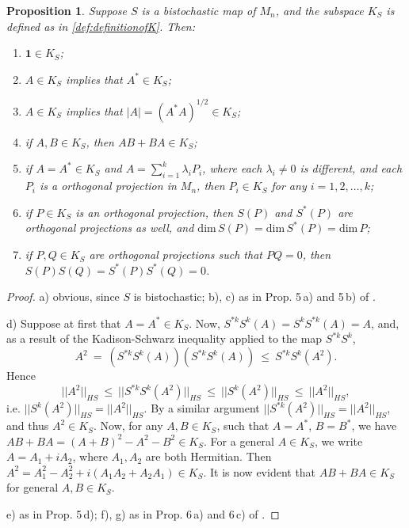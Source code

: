 \documentclass[12pt]{article}
\theoremstyle{plain}
\newtheorem{proposition}{Proposition}
\theoremstyle{definition}
\theoremstyle{remark}
\numberwithin{equation}{section}
\begin{document}
\begin{proposition}
\label{prop:propertiesofK}
Suppose $S$ is a bistochastic map of $M_{n}$,
and the subspace $K_{S}$ is defined as in \eqref{def:definitionofK}.
Then:

\let \oldlabelenumi \labelenumi
\renewcommand{\labelenumi}{\alph{enumi})}
\begin{enumerate}
\item $\mathbf{1} \in K_{S}$;
\item $A \in K_{S}$ implies that $A^{*} \in K_{S}$;
\item  $A  \in K_{S}$ implies that
$|A| = (A^{*}A)^{1/2} \in K_{S}$;
\item if $A, B \in K_{S}$, then $AB + BA \in K_{S}$;
\item if $A = A^{*} \in K_{S}$ and $A = \sum_{i=1}^{k} \lambda_{i} P_{i}$,
where each $\lambda_{i} \neq 0$ is different,
and each $P_{i}$ is a orthogonal projection in $M_{n}$,
then $P_{i} \in K_{S}$ for any $i = 1,2,\ldots,k$;
\item if $P \in K_{S}$ is an orthogonal projection,
then $S(P)$ and $S^{*}(P)$ are orthogonal projections as well,
and $\mathrm{dim} \, S(P) = \mathrm{dim} \, S^{*}(P) = \mathrm{dim} \, P$;
\item if $P, Q \in K_{S}$ are orthogonal projections such that $P Q = 0$,
then $S(P) S(Q) = S^{*}(P) S^{*}(Q) = 0$.
\end{enumerate}
\let \labelenumi \oldlabelenumi
\end{proposition}

\begin{proof}
a) obvious, since $S$ is bistochastic;
b), c) as in Prop. 5\,a) and 5\,b) of \cite{olkiewicz1999environment}.

d)  Suppose at first that $A = A^{*} \in K_{S}$.
Now, $S^{*k} S^{k}(A) = S^{k} S^{*k}(A) = A$,
and, as a result of the Kadison-Schwarz inequality applied to the map
$S^{*k} S^{k}$,
\begin{equation}
A^{2} \: = \: \left( S^{*k} S^{k}(A) \right) \left( S^{*k} S^{k}(A) \right)
    \: \leq \: S^{*k} S^{k}(A^{2}).
\end{equation}
Hence
\begin{equation}
||A^{2}||_{HS} \: \leq \: || S^{*k} S^{k}(A^{2}) ||_{HS} \: \leq \:
    || S^{k}(A^{2}) ||_{HS} \: \leq \: ||A^{2}||_{HS},
\end{equation}
i.e. $|| S^{k}(A^{2}) ||_{HS} = ||A^{2}||_{HS}$.
By a similar argument
$|| S^{*k}(A^{2}) ||_{HS} = ||A^{2}||_{HS}$,
and thus $A^{2} \in K_{S}$.
Now, for any $A, B \in K_{S}$, such that $A = A^{*}$, $B = B^{*}$,
we have
$AB + BA = (A + B)^{2} - A^{2} - B^{2} \in K_{S}$.
For a general $A \in K_{S}$, we write
$A = A_{1} + i A_{2}$, where $A_{1}, A_{2}$ are both Hermitian.
Then
$A^{2} = A_{1}^{2} - A_{2}^{2} + i(A_{1} A_{2} + A_{2} A_{1}) \in K_{S}$.
It is now evident that $AB+BA \in K_{S}$ for general $A,B \in K_{S}$.

e) as in Prop. 5\,d);
f), g) as in Prop. 6\,a) and 6\,c) of
\cite{olkiewicz1999environment}.
\end{proof}
\end{document}
